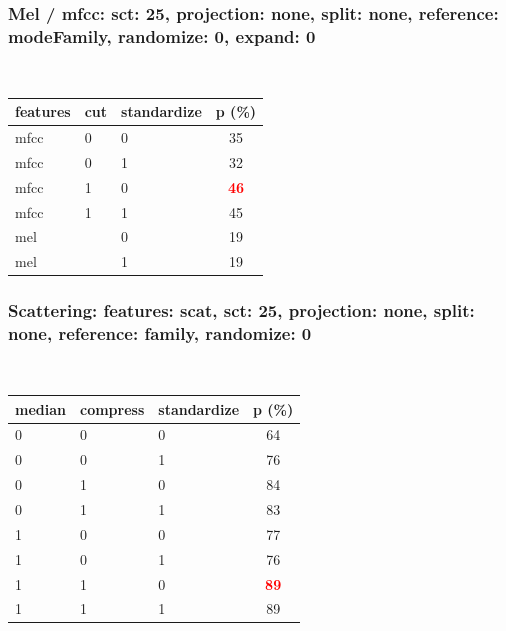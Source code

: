 \documentclass{beamer}
\begin{document}
\begin{frame}\frametitle{Mel / mfcc: sct: 25, projection: none, split: none, reference: modeFamily, randomize: 0, expand: 0}

\begin{table}
\begin{center}
\
\setlength{\tabcolsep}{.16667em}
\begin{tabular}{lllc}
features & cut & standardize & p (\%) \\
\hline
mfcc & 0 & 0 & 35 \\
mfcc & 0 & 1 & 32 \\
mfcc & 1 & 0 & \textbf{\textcolor{red}{46}} \\
mfcc & 1 & 1 & 45 \\
mel &  & 0 & 19 \\
mel &  & 1 & 19 \\
\end{tabular}
\end{center}
\label{sc25PrnoSpnoRemofaRa0Ex0}
\end{table}

\end{frame}
\begin{frame}\frametitle{Scattering: features: scat, sct: 25, projection: none, split: none, reference: family, randomize: 0}

\begin{table}
\begin{center}
\
\setlength{\tabcolsep}{.16667em}
\begin{tabular}{lllc}
median & compress & standardize & p (\%) \\
\hline
0 & 0 & 0 & 64 \\
0 & 0 & 1 & 76 \\
0 & 1 & 0 & 84 \\
0 & 1 & 1 & 83 \\
1 & 0 & 0 & 77 \\
1 & 0 & 1 & 76 \\
1 & 1 & 0 & \textbf{\textcolor{red}{89}} \\
1 & 1 & 1 & 89 \\
\end{tabular}
\end{center}
\label{fescSc25PrnoSpnoRefaRa0}
\end{table}

\end{frame}
\end{document}
